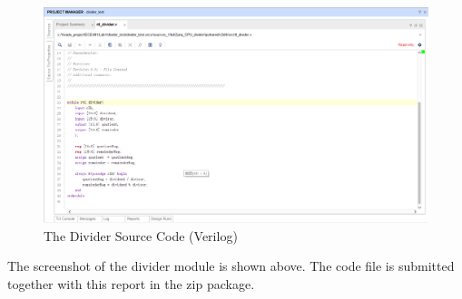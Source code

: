 \documentclass[a4paper]{article}
\begin{document}
\begin{figure}[H]
    \centering
    \includegraphics[width=14cm]{12}
    \caption{The Divider Source Code (Verilog)}
    \label{fig:12}
\end{figure}
The screenshot of the divider module is shown above. The code file is submitted together with this report in the zip package.
\clearpage
\end{document}

